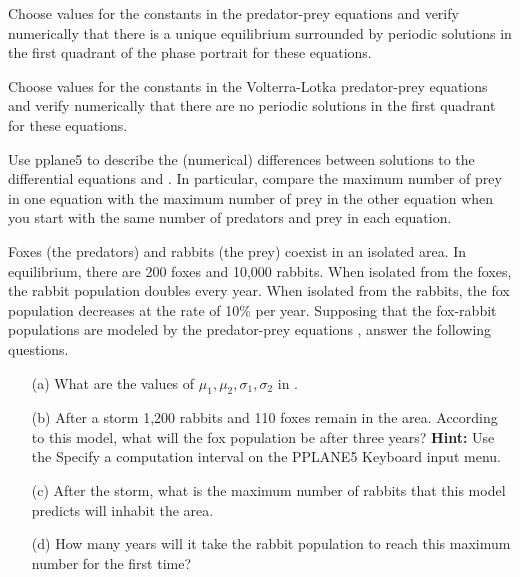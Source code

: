\documentclass{ximera}
\begin{document}
\begin{exercise} \label{c9.1.3}
Choose values for the constants in the predator-prey equations 
 and verify numerically that there is a unique 
equilibrium surrounded by periodic solutions in the first 
quadrant of the phase portrait for these equations.
\end{exercise}

\begin{exercise} \label{c9.1.4}
Choose values for the constants in the Volterra-Lotka predator-prey equations 
 and verify numerically that there are no periodic solutions in 
the first quadrant for these equations.
\end{exercise}

\begin{exercise} \label{c9.1.7}
Use {\sf pplane5} to describe the (numerical) differences between solutions 
to the differential equations  and .  In particular,
compare the maximum number of prey in one equation with the maximum number of 
prey in the other equation when you start with the same number of predators 
and prey in each equation.
\end{exercise}

\begin{exercise} \label{c9.1.8}
Foxes (the predators) and rabbits (the prey) coexist in an isolated area.
In equilibrium, there are 200 foxes and 10,000 rabbits.  When isolated from
the foxes, the rabbit population doubles every year.  When isolated from 
the rabbits, the fox population decreases at the rate of 10\% per year. 
Supposing that the fox-rabbit populations are modeled by the predator-prey
equations , answer the following questions.
\begin{itemize}
\item[(a)]  	What are the values of $\mu_1,\mu_2,\sigma_1,\sigma_2$ in 
.
\item[(b)]	After a storm 1,200 rabbits and 110 foxes remain in the area.
According to this model, what will the fox population be after three years?  
{\bf Hint:}  Use the {\sf Specify a computation interval} on the 
{\sf PPLANE5 Keyboard input} menu.
\item[(c)]	After the storm, what is the maximum number of rabbits that 
this model predicts will inhabit the area.
\item[(d)]	How many years will it take the rabbit population to reach 
this maximum number for the first time?
\end{itemize}
\end{exercise}
\end{document}
